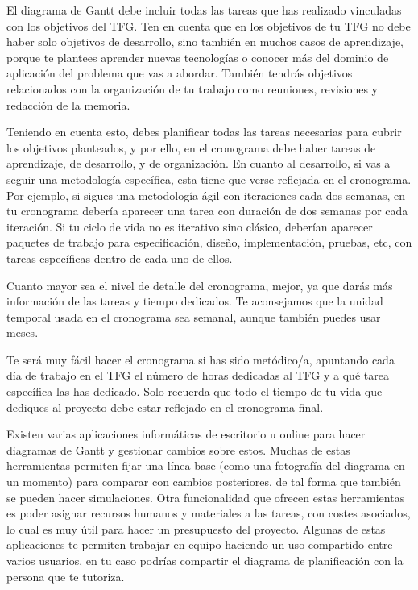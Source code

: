 El diagrama de Gantt debe incluir todas las tareas que has realizado vinculadas con los objetivos del TFG. Ten en cuenta que en los objetivos de tu TFG no debe haber solo objetivos de desarrollo, sino también en muchos casos de aprendizaje, porque te plantees aprender nuevas tecnologías o conocer más del dominio de aplicación del problema que vas a abordar. También tendrás objetivos relacionados con la organización de tu trabajo como reuniones, revisiones y redacción de la memoria. 

Teniendo en cuenta esto, debes planificar todas las tareas necesarias para cubrir los objetivos planteados, y por ello, en el cronograma debe haber tareas de aprendizaje, de desarrollo, y de organización. En cuanto al desarrollo, si vas a seguir una metodología específica, esta tiene que verse reflejada en el cronograma. Por ejemplo, si sigues una metodología ágil con iteraciones cada dos semanas, en tu cronograma debería aparecer una tarea con duración de dos semanas por cada iteración. Si tu ciclo de vida no es iterativo sino clásico, deberían aparecer paquetes de trabajo para especificación, diseño, implementación, pruebas, etc, con tareas específicas dentro de cada uno de ellos.

Cuanto mayor sea el nivel de detalle del cronograma, mejor, ya que darás más información de las tareas y tiempo dedicados. Te aconsejamos que la unidad temporal usada en el cronograma sea semanal, aunque también puedes usar meses. 

Te será muy fácil hacer el cronograma si has sido metódico/a, apuntando cada día de trabajo en el TFG el número de horas dedicadas al TFG y a qué tarea específica las has dedicado. Solo recuerda que todo el tiempo de tu vida que dediques al proyecto debe estar reflejado en el cronograma final. 

Existen varias aplicaciones informáticas de escritorio u online para hacer diagramas de Gantt y gestionar cambios sobre estos. Muchas de estas herramientas permiten fijar una línea base (como una fotografía del diagrama en un momento) para comparar con cambios posteriores, de tal forma que también se pueden hacer simulaciones. Otra funcionalidad que ofrecen estas herramientas es poder asignar recursos humanos y materiales a las tareas, con costes asociados, lo cual es muy útil para hacer un presupuesto del proyecto. Algunas de estas aplicaciones te permiten trabajar en equipo haciendo un uso compartido entre varios usuarios, en tu caso podrías compartir el diagrama de planificación con la persona que te tutoriza.

